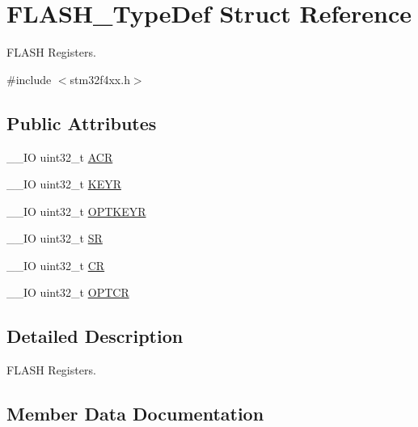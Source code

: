 \hypertarget{struct_f_l_a_s_h___type_def}{}\section{F\+L\+A\+S\+H\+\_\+\+Type\+Def Struct Reference}
\label{struct_f_l_a_s_h___type_def}


F\+L\+A\+S\+H Registers.  




{\ttfamily \#include $<$stm32f4xx.\+h$>$}

\subsection*{Public Attributes}
\begin{DoxyCompactItemize}
\item 
\+\_\+\+\_\+\+I\+O uint32\+\_\+t \hyperlink{struct_f_l_a_s_h___type_def_aaf432a8a8948613f4f66fcace5d2e5fe}{A\+C\+R}
\item 
\+\_\+\+\_\+\+I\+O uint32\+\_\+t \hyperlink{struct_f_l_a_s_h___type_def_a802e9a26a89b44decd2d32d97f729dd3}{K\+E\+Y\+R}
\item 
\+\_\+\+\_\+\+I\+O uint32\+\_\+t \hyperlink{struct_f_l_a_s_h___type_def_a793cd13a4636c9785fdb99316f7fd7ab}{O\+P\+T\+K\+E\+Y\+R}
\item 
\+\_\+\+\_\+\+I\+O uint32\+\_\+t \hyperlink{struct_f_l_a_s_h___type_def_a52c4943c64904227a559bf6f14ce4de6}{S\+R}
\item 
\+\_\+\+\_\+\+I\+O uint32\+\_\+t \hyperlink{struct_f_l_a_s_h___type_def_a7919306d0e032a855200420a57f884d7}{C\+R}
\item 
\+\_\+\+\_\+\+I\+O uint32\+\_\+t \hyperlink{struct_f_l_a_s_h___type_def_a54026c3b5bc2059f1b187acb6c4817ac}{O\+P\+T\+C\+R}
\end{DoxyCompactItemize}


\subsection{Detailed Description}
F\+L\+A\+S\+H Registers. 

\subsection{Member Data Documentation}
\hypertarget{struct_f_l_a_s_h___type_def_aaf432a8a8948613f4f66fcace5d2e5fe}{}

